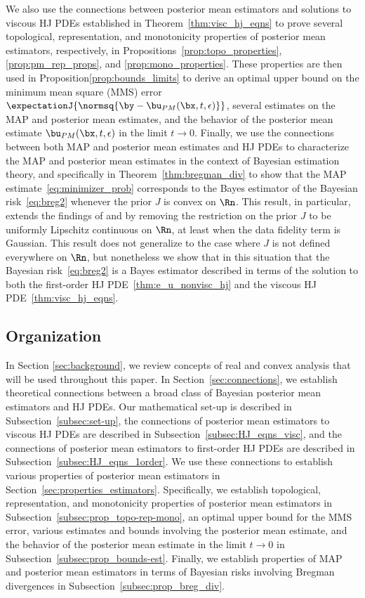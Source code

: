We also use the connections between posterior mean estimators and solutions to viscous HJ PDEs established in Theorem~\ref{thm:visc_hj_eqns} to prove several topological, representation, and monotonicity properties of posterior mean estimators, respectively, in Propositions~\ref{prop:topo_properties}, \ref{prop:pm_rep_props}, and \ref{prop:mono_properties}. These properties are then used in Proposition\ref{prop:bounds_limits} to derive an optimal upper bound on the minimum mean square (MMS) error $\expectationJ{\normsq{\by-\bu_{PM}(\bx,t,\epsilon)}}$, several estimates on the MAP and posterior mean estimates, and the behavior of the posterior mean estimate $\bu_{PM}(\bx,t,\epsilon)$ in the limit $t \to 0$. 
Finally, we use the connections between both MAP and posterior mean estimates and HJ PDEs to characterize the MAP and posterior mean estimates in the context of Bayesian estimation theory, and specifically in Theorem~\ref{thm:bregman_div} to show that the MAP estimate~\eqref{eq:minimizer_prob} corresponds to the Bayes estimator of the Bayesian risk~\eqref{eq:breg2} whenever the prior $J$ is convex on $\Rn$. This result, in particular, extends the findings of \cite{burger2014maximum} and \cite{pereyra2019revisiting} by removing the restriction on the prior $J$ to be uniformly Lipschitz continuous on $\Rn$, at least when the data fidelity term is Gaussian. This result does not generalize to the case where $J$ is not defined everywhere on $\Rn$, but nonetheless we show that in this situation that the Bayesian risk~\eqref{eq:breg2} is a Bayes estimator described in terms of the solution to both the first-order HJ PDE~\eqref{thm:e_u_nonvisc_hj} and the viscous HJ PDE~\eqref{thm:visc_hj_eqns}.

\subsection{Organization}\label{subsec:intro_organization}
In Section \ref{sec:background}, we review concepts of real and convex analysis that will be used throughout this paper. In Section~\ref{sec:connections}, we establish theoretical connections between a broad class of Bayesian posterior mean estimators and HJ PDEs. Our mathematical set-up is described in Subsection~\ref{subsec:set-up}, the connections of posterior mean estimators to viscous HJ PDEs are described in Subsection~\ref{subsec:HJ_eqns_visc}, and the connections of posterior mean estimators to first-order HJ PDEs are described in Subsection~\ref{subsec:HJ_eqns_1order}. We use these connections to establish various properties of posterior mean estimators in Section~\ref{sec:properties_estimators}. Specifically, we establish topological, representation, and monotonicity properties of posterior mean estimators in Subsection~\ref{subsec:prop_topo-rep-mono}, an optimal upper bound for the MMS error, various estimates and bounds involving the posterior mean estimate, and the behavior of the posterior mean estimate in the limit $t \to 0$ in Subsection~\ref{subsec:prop_bounds-est}. Finally, we establish properties of MAP and posterior mean estimators in terms of Bayesian risks involving Bregman divergences in Subsection~\ref{subsec:prop_breg_div}.